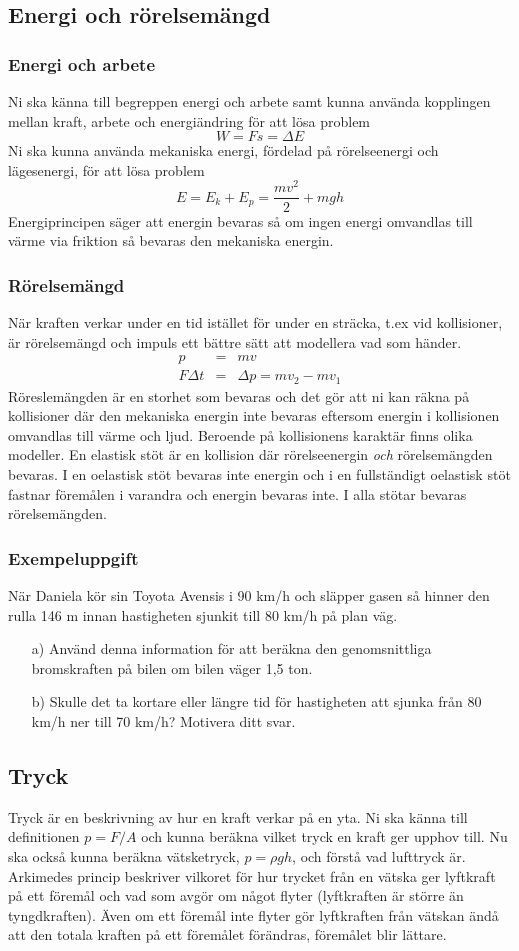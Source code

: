 \documentclass[10pt, titlepage, oneside, a4paper]{article}
\newcommand{\Subsection}[1]{\vspace{-4pt}\subsection{#1}\vspace{-8pt}}
\newcommand{\Subsubsection}[1]{\vspace{-4pt}\subsubsection{#1}\vspace{-8pt}}
\begin{document}
    \newpage
    \Subsection{Energi och rörelsemängd}
    \Subsubsection{Energi och arbete}
    Ni ska känna till begreppen energi och arbete samt kunna använda kopplingen mellan kraft, arbete och energiändring
    för att lösa problem
    \begin{equation}
        W = F s = \Delta E
    \end{equation}
    Ni ska kunna använda mekaniska energi, fördelad på rörelseenergi och lägesenergi, för att lösa problem
    \begin{equation}
        E = E_k + E_p = \frac{mv^2}{2} + mgh
    \end{equation}
    Energiprincipen säger att energin bevaras så om ingen energi omvandlas till värme via friktion så bevaras
    den mekaniska energin.
    \Subsubsection{Rörelsemängd}
    När kraften verkar under en tid istället för under en sträcka, t.ex vid kollisioner, är rörelsemängd och impuls ett
    bättre sätt att modellera vad som händer.
    \begin{eqnarray}
        p & = & mv \\
        F \Delta t & = & \Delta p = mv_2 - mv_1
    \end{eqnarray}
    Röreslemängden är en storhet som bevaras och det gör att ni kan räkna på kollisioner där den mekaniska energin inte bevaras
    eftersom energin i kollisionen omvandlas till värme och ljud. Beroende på kollisionens karaktär finns olika modeller. En
    elastisk stöt är en kollision där rörelseenergin \emph{och} rörelsemängden bevaras. I en oelastisk stöt bevaras inte energin
    och i en fullständigt oelastisk stöt fastnar föremålen i varandra och energin bevaras inte. I alla stötar bevaras rörelsemängden.
    \Subsubsection{Exempeluppgift}
    När Daniela kör sin Toyota Avensis i 90 km/h och
    släpper gasen så hinner den rulla 146 m innan
    hastigheten sjunkit till 80 km/h på plan väg.
    \begin{itemize}
        \item[a)] Använd denna information för att beräkna den
        genomsnittliga bromskraften på bilen om bilen
        väger 1,5 ton.
        \item[b)] Skulle det ta kortare eller längre tid för
        hastigheten att sjunka från 80 km/h ner till 70
        km/h? Motivera ditt svar.
    \end{itemize}
    \newpage
    \Subsection{Tryck}
    Tryck är en beskrivning av hur en kraft verkar på en yta. Ni ska känna till definitionen $p=F/A$ och kunna beräkna
    vilket tryck en kraft ger upphov till. Nu ska också kunna beräkna vätsketryck, $p = \rho g h$, och förstå vad lufttryck är.
    Arkimedes princip beskriver vilkoret för hur trycket från en vätska ger lyftkraft på ett föremål och vad som avgör
    om något flyter (lyftkraften är större än tyngdkraften). Även om ett föremål inte flyter gör lyftkraften från vätskan
    ändå att den totala kraften på ett föremålet förändras, föremålet blir lättare.
\end{document}
